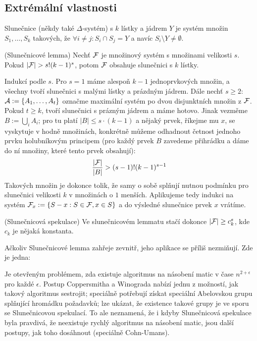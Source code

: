 \subsection{Extrémální vlastnosti}

\df Slunečnice (někdy také $\Delta$-systém) s $k$ lístky a jádrem $Y$ je systém 
množin $S_1, \dots, S_k$ takových, že $\forall i\neq j: S_i \cap S_j = Y$ a 
navíc $S_i \setminus Y \neq \emptyset$.

\vt (Slunečnicové lemma) Nechť $\mathcal{F}$ je množinový systém s množinami velikosti 
$s$.  Pokud $|\mathcal{F}| > s!  (k-1)^s$, potom $\mathcal{F}$ obsahuje slunečnici s $k$ lístky.

\dk Indukcí podle $s$. Pro $s=1$ máme alespoň $k-1$ jednoprvkových množin, a 
všechny tvoří slunečnici s malými lístky a prázdným jádrem. Dále nechť $s\geq 
2$: $\mathcal{A} := \{A_1, \dots, A_t\}$ označme maximální systém po dvou disjunktních 
množin z $\mathcal{F}$. Pokud $t \geq k$, tvoří slunečnici s prázným jádrem a máme 
hotovo. Jinak vezměme $B := \bigcup_i A_i$; pro tu platí $|B| \leq s\cdot (k-1)$ 
a nějaký prvek, říkejme mu $x$, se vyskytuje v hodně množinách, konkrétně můžeme 
odhadnout četnost jednoho prvku holubníkovým principem (pro každý prvek $B$ 
zavedeme přihrádku a dáme do ní množiny, které tento prvek obsahují):
\begin{align*}
	{|\mathcal{F}| \over |B|} > (s-1)!(k-1)^{s-1}
\end{align*}
Takových množin je dokonce tolik, že samy o sobě splňují nutnou podmínku pro 
slunečnici velikosti $k$ v množinách o $1$ menších. Aplikujeme tedy indukci na 
systém $\mathcal{F}_x := \{S - x: S \in \mathcal{F}, x \in S\}$ a do výsledné slunečnice prvek 
$x$ vrátíme.

\vt (Slunečnicová spekulace) Ve slunečnicovém lemmatu stačí dokonce $|\mathcal{F}| \geq 
c_k^s$, kde $c_k$ je nějaká konstanta.

\pzn Ačkoliv Slunečnicové lemma zahřeje zevnitř, jeho aplikace se příliš 
nezmiňují. Zde je jedna:

Je otevřeným problémem, zda existuje algoritmus na násobení matic v čase 
$n^{2+\epsilon}$ pro každé $\epsilon$. Postup Coppersmitha a Winograda nabízí 
jednu z možností, jak takový algoritmus sestrojit; speciálně potřebují získat 
speciální Abelovskou grupu splňující hromádku požadavků; lze ukázat, že 
existence takové grupy je ve sporu se Slunečnicovou spekulací. To ale 
neznamená, že i kdyby Slunečnicová spekulace byla pravdivá, že neexistuje 
rychlý algoritmus na násobení matic, jsou další postupy, jak toho dosáhnout 
(speciálně Cohn-Umans).


